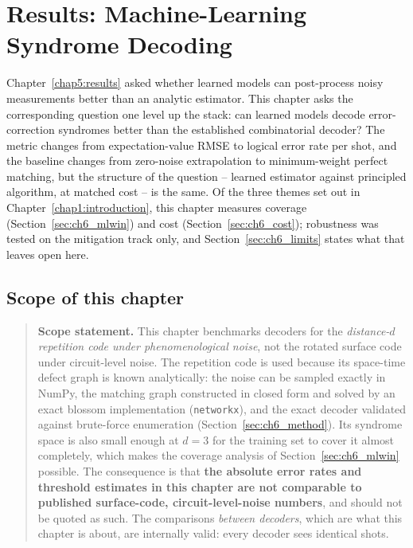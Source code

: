 \documentclass[Thesis.tex]{subfiles}
\begin{document}
\newpage
\setcounter{chapter}{5} %


\thispagestyle{empty}

\chapter{Results: Machine-Learning Syndrome Decoding}\label{chap6:decoding}

Chapter~\ref{chap5:results} asked whether learned models can post-process noisy
measurements better than an analytic estimator. This chapter asks the corresponding
question one level up the stack: can learned models decode error-correction
syndromes better than the established combinatorial decoder? The metric changes from
expectation-value RMSE to logical error rate per shot, and the baseline changes from
zero-noise extrapolation to minimum-weight perfect matching, but the structure of
the question -- learned estimator against principled algorithm, at matched cost -- is
the same. Of the three themes set out in Chapter~\ref{chap1:introduction}, this
chapter measures coverage (Section~\ref{sec:ch6_mlwin}) and cost
(Section~\ref{sec:ch6_cost}); robustness was tested on the mitigation track only,
and Section~\ref{sec:ch6_limits} states what that leaves open here.

\section{Scope of this chapter}\label{sec:ch6_scope}

\begin{quote}
\textbf{Scope statement.} This chapter benchmarks decoders for the \emph{distance-$d$
repetition code under phenomenological noise}, not the rotated surface code under
circuit-level noise. The repetition code is used because its space-time defect
graph is known analytically: the noise can be sampled exactly in NumPy, the matching
graph constructed in closed form and solved by an exact blossom implementation
(\texttt{networkx}), and the exact decoder validated against brute-force enumeration
(Section~\ref{sec:ch6_method}). Its syndrome space is also small enough at $d = 3$
for the training set to cover it almost completely, which makes the coverage
analysis of Section~\ref{sec:ch6_mlwin} possible. The consequence is that \textbf{the absolute error rates and
threshold estimates in this chapter are not comparable to published surface-code,
circuit-level-noise numbers}, and should not be quoted as such. The comparisons
\emph{between decoders}, which are what this chapter is about, are internally valid:
every decoder sees identical shots.
\end{quote}
\end{document}
